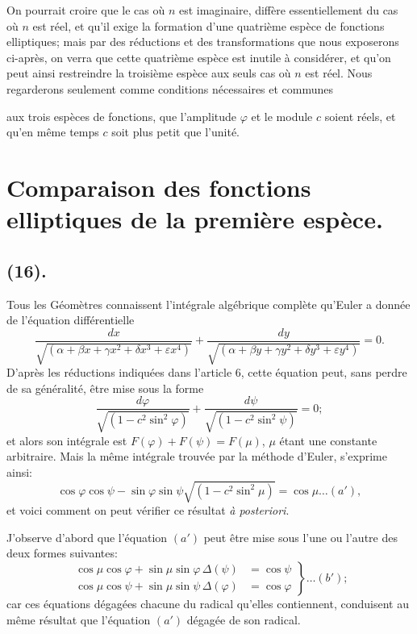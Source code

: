 \documentclass{article}
\begin{document}
On pourrait croire que le cas où $n$ est imaginaire, diffère essentiellement du cas où $n$ est réel, et qu'il exige la formation d'une quatrième espèce de fonctions elliptiques; mais par des réductions et des transformations que nous exposerons ci-après, on verra que cette quatrième espèce est inutile à considérer, et qu'on peut ainsi restreindre la troisième espèce aux seuls cas où $n$ est réel. Nous regarderons seulement comme conditions nécessaires et communes

aux trois espèces de fonctions, que l'amplitude $\varphi$ et le module $c$ soient réels, et qu'en même temps $c$ soit plus petit que l'unité.

\section*{Comparaison des fonctions elliptiques de la première espèce.}

\subsection*{(16).}

Tous les Géomètres connaissent l'intégrale algébrique complète qu'Euler a donnée de l'équation différentielle
\[ \frac{dx}{\sqrt{(\alpha+\beta x+\gamma x^{2}+\delta x^{3}+\varepsilon x^{4})}}+\frac{dy}{\sqrt{(\alpha+\beta y+\gamma y^{2}+\delta y^{3}+\varepsilon y^{4})}}=0. \]
D'après les réductions indiquées dans l'article 6, cette équation peut, sans perdre de sa généralité, être mise sous la forme
\[ \frac{d\varphi}{\sqrt{(1-c^{2}\sin^{2}\varphi)}}+\frac{d\psi}{\sqrt{(1-c^{2}\sin^{2}\psi)}}=0; \]
et alors son intégrale est $F(\varphi)+F(\psi)=F(\mu)$, $\mu$ étant une constante arbitraire. Mais la même intégrale trouvée par la méthode d'Euler, s'exprime ainsi:
\[ \cos\varphi\cos\psi-\sin\varphi\sin\psi\sqrt{(1-c^{2}\sin^{2}\mu)}=\cos\mu\ldots(a'), \]
et voici comment on peut vérifier ce résultat \emph{à posteriori}.

J'observe d'abord que l'équation $(a')$ peut être mise sous l'une ou l'autre des deux formes suivantes:
\[ \left.\begin{aligned} \cos\mu\cos\varphi+\sin\mu\sin\varphi\,\Delta(\psi)&=\cos\psi\\ \cos\mu\cos\psi+\sin\mu\sin\psi\,\Delta(\varphi)&=\cos\varphi \end{aligned}\right\}\ldots(b'); \]
car ces équations dégagées chacune du radical qu'elles contiennent, conduisent au même résultat que l'équation $(a')$ dégagée de son radical.
\end{document}
